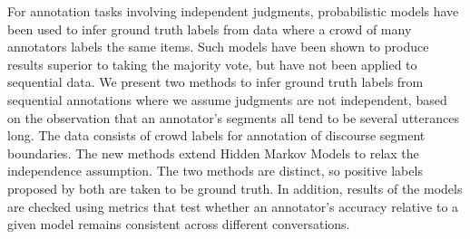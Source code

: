For annotation tasks involving independent judgments, probabilistic models have been used to infer ground truth labels from data where a crowd of many annotators labels the same items.  Such models have been shown to produce results superior to taking the majority vote, but have not been applied to sequential data. We present two methods to infer ground truth labels from sequential annotations where we assume judgments are not independent, based on the observation that an annotator's segments all tend to be several utterances long. The data consists of crowd labels for annotation of discourse segment boundaries. The new methods extend Hidden Markov Models to relax the independence assumption. The two methods are distinct, so positive labels proposed by both are taken to be ground truth. In addition, results of the models are checked using metrics that test whether an annotator's accuracy relative to a given model remains consistent across different conversations.
